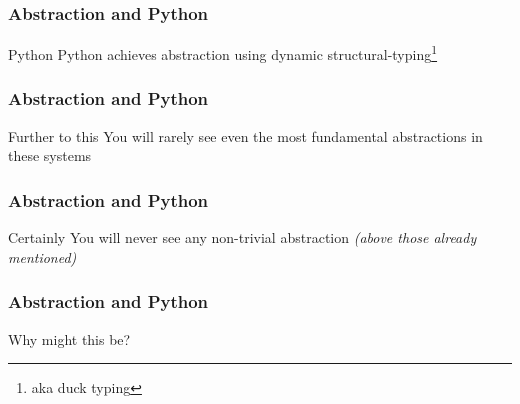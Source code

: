 \begin{frame}
\frametitle{Abstraction and Python}
\begin{block}{Python}
Python achieves abstraction using dynamic structural-typing\footnote{aka duck typing}
\end{block}
\end{frame}


\begin{frame}
\frametitle{Abstraction and Python}
\begin{block}{Further to this}
You will rarely see even the most fundamental abstractions in these systems
\end{block}
\end{frame}


\begin{frame}
\frametitle{Abstraction and Python}
\begin{block}{Certainly}
You will never see any non-trivial abstraction \tiny{\emph{(above those already mentioned)}}\normalsize
\end{block}
\end{frame}


\begin{frame}
\frametitle{Abstraction and Python}
\begin{center}
\huge{Why might this be?}
\end{center}
\normalsize
\end{frame}
